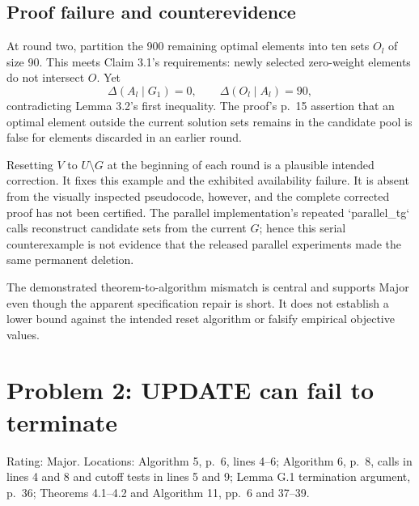 \documentclass[10pt]{article}
\begin{document}
\subsection*{Proof failure and counterevidence}
At round two, partition the 900 remaining optimal elements into ten sets \(O_l\) of size 90. This meets Claim 3.1’s requirements: newly selected zero-weight elements do not intersect \(O\). Yet \[\Delta(A_l\mid G_1)=0,\qquad
 \Delta(O_l\mid A_l)=90,\] contradicting Lemma 3.2’s first inequality. The proof’s p. 15 assertion that an optimal element outside the current solution sets remains in the candidate pool is false for elements discarded in an earlier round.\par
Resetting \(V\) to \(U\setminus G\) at the beginning of each round is a plausible intended correction. It fixes this example and the exhibited availability failure. It is absent from the visually inspected pseudocode, however, and the complete corrected proof has not been certified. The parallel implementation’s repeated `parallel\_tg` calls reconstruct candidate sets from the current \(G\); hence this serial counterexample is not evidence that the released parallel experiments made the same permanent deletion.\par
The demonstrated theorem-to-algorithm mismatch is central and supports Major even though the apparent specification repair is short. It does not establish a lower bound against the intended reset algorithm or falsify empirical objective values.\par
\section*{Problem 2: UPDATE can fail to terminate}
Rating: Major. Locations: Algorithm 5, p. 6, lines 4–6; Algorithm 6, p. 8, calls in lines 4 and 8 and cutoff tests in lines 5 and 9; Lemma G.1 termination argument, p. 36; Theorems 4.1–4.2 and Algorithm 11, pp. 6 and 37–39.\par
\end{document}
